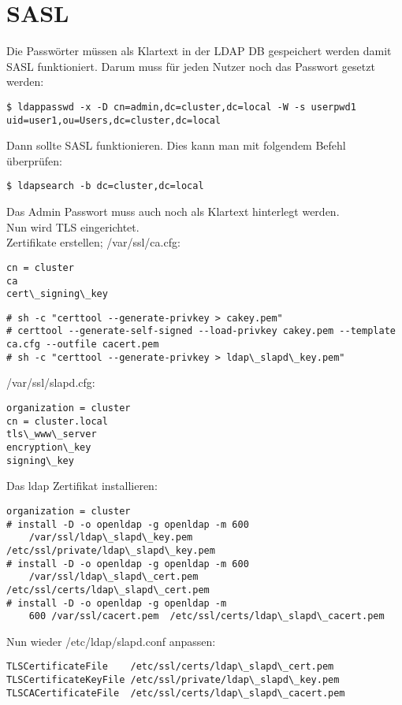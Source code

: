 \section{SASL}
Die Passwörter müssen als Klartext in der LDAP DB gespeichert werden damit SASL funktioniert. Darum muss für jeden Nutzer noch das Passwort gesetzt werden:
\begin{lstlisting}[style=Bash]
$ ldappasswd -x -D cn=admin,dc=cluster,dc=local -W -s userpwd1 uid=user1,ou=Users,dc=cluster,dc=local 
\end{lstlisting}
Dann sollte SASL funktionieren. Dies kann man mit folgendem Befehl überprüfen:
\begin{lstlisting}[style=Bash]
$ ldapsearch -b dc=cluster,dc=local
\end{lstlisting}
Das Admin Passwort muss auch noch als Klartext hinterlegt werden.\\
Nun wird TLS eingerichtet.\\
Zertifikate erstellen; /var/ssl/ca.cfg:
\begin{lstlisting}[style=Bash]
cn = cluster
ca
cert\_signing\_key
\end{lstlisting}
\begin{lstlisting}[style=Bash]
# sh -c "certtool --generate-privkey > cakey.pem" 
# certtool --generate-self-signed --load-privkey cakey.pem --template ca.cfg --outfile cacert.pem 
# sh -c "certtool --generate-privkey > ldap\_slapd\_key.pem"
\end{lstlisting}
/var/ssl/slapd.cfg:
\begin{lstlisting}[style=Bash]
organization = cluster
cn = cluster.local
tls\_www\_server
encryption\_key
signing\_key
\end{lstlisting}
Das ldap Zertifikat installieren:
\begin{lstlisting}[style=Bash]
organization = cluster
# install -D -o openldap -g openldap -m 600 
    /var/ssl/ldap\_slapd\_key.pem  /etc/ssl/private/ldap\_slapd\_key.pem
# install -D -o openldap -g openldap -m 600 
    /var/ssl/ldap\_slapd\_cert.pem  /etc/ssl/certs/ldap\_slapd\_cert.pem
# install -D -o openldap -g openldap -m 
    600 /var/ssl/cacert.pem  /etc/ssl/certs/ldap\_slapd\_cacert.pem 
\end{lstlisting}
Nun wieder /etc/ldap/slapd.conf anpassen:
\begin{lstlisting}[style=Bash]
TLSCertificateFile    /etc/ssl/certs/ldap\_slapd\_cert.pem
TLSCertificateKeyFile /etc/ssl/private/ldap\_slapd\_key.pem
TLSCACertificateFile  /etc/ssl/certs/ldap\_slapd\_cacert.pem
\end{lstlisting}
